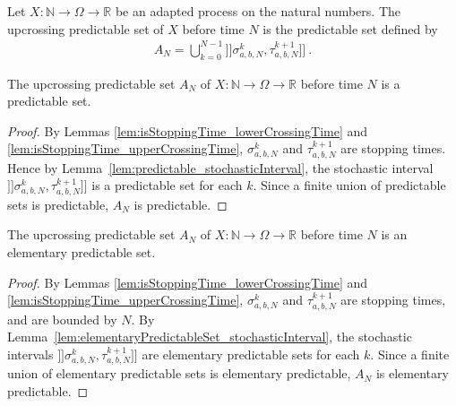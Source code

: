 \begin{definition}\label{def:upcrossingPredictableSet}
Let $X : \mathbb{N} \to \Omega \to \mathbb{R}$ be an adapted process on the natural numbers.
The upcrossing predictable set of $X$ before time $N$ is the predictable set defined by
\begin{align*}
  A_N = \bigcup_{k=0}^{N-1} ]\!]\sigma^k_{a, b, N}, \tau^{k+1}_{a, b, N}]\!]
  \:.
\end{align*}
\end{definition}


\begin{lemma}\label{lem:predictable_upcrossingPredictableSet}
The upcrossing predictable set $A_N$ of $X : \mathbb{N} \to \Omega \to \mathbb{R}$ before time $N$ is a predictable set.
\end{lemma}

\begin{proof}
By Lemmas \ref{lem:isStoppingTime_lowerCrossingTime} and \ref{lem:isStoppingTime_upperCrossingTime}, $\sigma^k_{a, b, N}$ and $\tau^{k+1}_{a, b, N}$ are stopping times.
Hence by Lemma~\ref{lem:predictable_stochasticInterval}, the stochastic interval $]\!]\sigma^k_{a, b, N}, \tau^{k+1}_{a, b, N}]\!]$ is a predictable set for each $k$.
Since a finite union of predictable sets is predictable, $A_N$ is predictable.
\end{proof}

\begin{lemma}\label{lem:elementaryPredictableSet_upcrossingPredictableSet}
The upcrossing predictable set $A_N$ of $X : \mathbb{N} \to \Omega \to \mathbb{R}$ before time $N$ is an elementary predictable set.
\end{lemma}

\begin{proof}
By Lemmas \ref{lem:isStoppingTime_lowerCrossingTime} and \ref{lem:isStoppingTime_upperCrossingTime}, $\sigma^k_{a, b, N}$ and $\tau^{k+1}_{a, b, N}$ are stopping times, and are bounded by $N$.
By Lemma~\ref{lem:elementaryPredictableSet_stochasticInterval}, the stochastic intervals $]\!]\sigma^k_{a, b, N}, \tau^{k+1}_{a, b, N}]\!]$ are elementary predictable sets for each $k$.
Since a finite union of elementary predictable sets is elementary predictable, $A_N$ is elementary predictable.
\end{proof}


